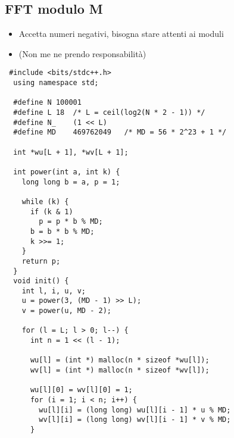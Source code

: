 \subsection{FFT modulo M}
\begin{itemize}
    \item Accetta numeri negativi, bisogna stare attenti ai moduli
    \item (Non me ne prendo responsabilità)
\end{itemize}
\begin{lstlisting}
 #include <bits/stdc++.h>
  using namespace std;

  #define N	100001
  #define L	18	/* L = ceil(log2(N * 2 - 1)) */
  #define N_	(1 << L)
  #define MD	469762049	/* MD = 56 * 2^23 + 1 */

  int *wu[L + 1], *wv[L + 1];

  int power(int a, int k) {
    long long b = a, p = 1;

    while (k) {
      if (k & 1)
        p = p * b % MD;
      b = b * b % MD;
      k >>= 1;
    }
    return p;
  }
  void init() {
    int l, i, u, v;
    u = power(3, (MD - 1) >> L);
    v = power(u, MD - 2);

    for (l = L; l > 0; l--) {
      int n = 1 << (l - 1);

      wu[l] = (int *) malloc(n * sizeof *wu[l]);
      wv[l] = (int *) malloc(n * sizeof *wv[l]);

      wu[l][0] = wv[l][0] = 1;
      for (i = 1; i < n; i++) {
        wu[l][i] = (long long) wu[l][i - 1] * u % MD;
        wv[l][i] = (long long) wv[l][i - 1] * v % MD;
      }


\end{lstlisting}
